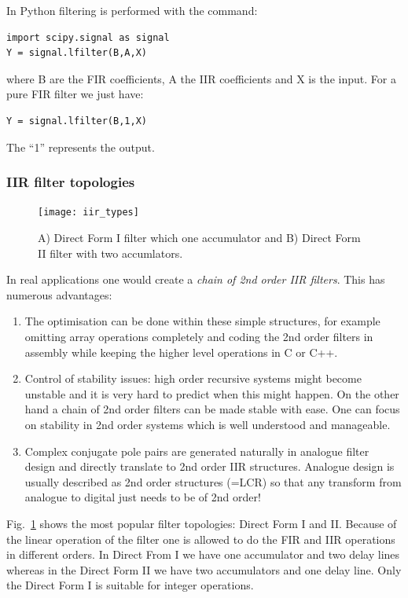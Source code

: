 \documentclass[12pt,a4paper]{article}
\begin{document}
In Python filtering is performed with the command:
\begin{verbatim}
import scipy.signal as signal
Y = signal.lfilter(B,A,X)
\end{verbatim}
where B are the FIR coefficients, A the IIR coefficients and X is the input.
For a pure FIR filter we just have:
\begin{verbatim}
Y = signal.lfilter(B,1,X)
\end{verbatim}
The ``1'' represents the output.


\subsubsection{IIR filter topologies}
\begin{figure}[!hbt]
\begin{center}
\mbox{\texttt{[image: iir\_types]}}
\end{center}
\caption{A) Direct Form I filter which one accumulator and
  B) Direct Form II filter with two accumlators.
\label{iir_types}}
\end{figure}
In real applications one would create a \textsl{chain of 2nd order
IIR filters}. This has numerous advantages:
\begin{enumerate}
\item The optimisation can be done within these simple structures,
  for example omitting array operations completely and coding
  the 2nd order filters in assembly while keeping the higher
  level operations in C or C++.
\item Control of stability issues: high order recursive
  systems might become unstable and it is very hard to predict
  when this might happen. On the other hand a chain of 2nd order
  filters can be made stable with ease. One can focus on
  stability in 2nd order systems which is well understood and
  manageable.
\item Complex conjugate pole pairs are generated naturally
  in analogue filter design and directly translate to 2nd
  order IIR structures. Analogue design is usually described
  as 2nd order structures (=LCR) so that any transform from analogue
  to digital just needs to be of 2nd order!
\end{enumerate}

Fig.~\ref{iir_types} shows the most popular filter topologies:
Direct Form I and II. Because of the linear operation of the filter
one is allowed to do the FIR and IIR operations in different orders.
In Direct From I we have one accumulator and two delay lines whereas
in the Direct Form II we have two accumulators and one delay line.
Only the Direct Form I is suitable for integer operations.
\end{document}
